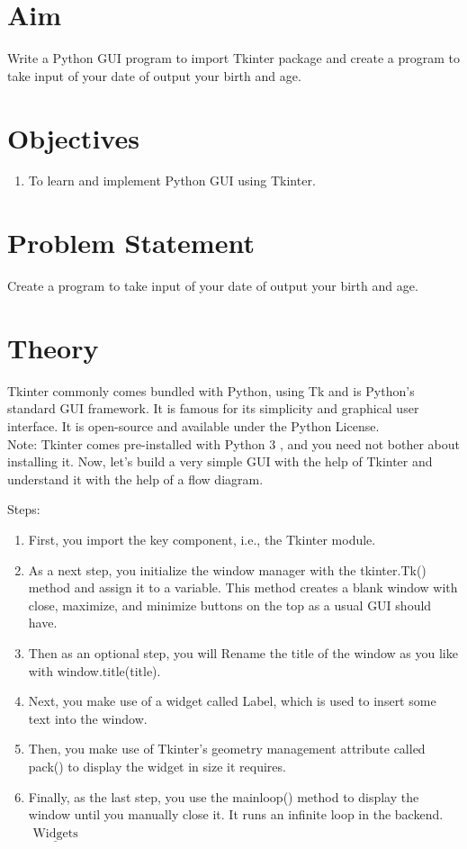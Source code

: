 \documentclass[11pt]{article}
\begin{document}
\tableofcontents
\thispagestyle{empty}
\clearpage

\setcounter{page}{1}

\section{Aim}
Write a Python GUI program to import Tkinter package and create a program to take input
of your date of output your birth and age.

\section{Objectives}
\begin{enumerate}
    \item To learn and implement Python GUI using Tkinter.
\end{enumerate}

\section{Problem Statement}
Create a program to take input of your date of output your birth and age.
\section{Theory}
Tkinter commonly comes bundled with Python, using Tk and is Python's standard GUI framework. It is famous for its simplicity and graphical user interface. It is open-source and available under the Python License.\\

Note: Tkinter comes pre-installed with Python 3 , and you need not bother about installing it. Now, let's build a very simple GUI with the help of Tkinter and understand it with the help of a flow diagram.

Steps:
\begin{enumerate}
    \item First, you import the key component, i.e., the Tkinter module.
    \item As a next step, you initialize the window manager with the tkinter.Tk() method and assign it to a variable. This method creates a blank window with close, maximize, and minimize buttons on the top as a usual GUI should have.
    \item Then as an optional step, you will Rename the title of the window as you like with window.title(title).
    \item Next, you make use of a widget called Label, which is used to insert some text into the window.
    \item Then, you make use of Tkinter's geometry management attribute called pack() to display the widget in size it requires.
    \item Finally, as the last step, you use the mainloop() method to display the window until you manually close it. It runs an infinite loop in the backend.
    $\underline{\text { Widgets }}$
\end{enumerate}
\end{document}
